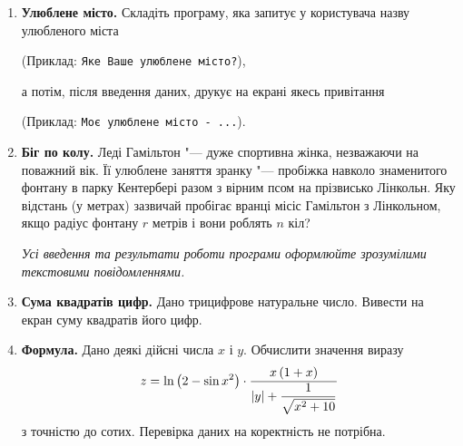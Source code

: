 \begin{enumerate}

\item \textbf{Улюблене місто.} Складіть програму, яка запитує у користувача назву улюбленого міста

(Приклад: \verb|Яке Ваше улюблене місто?|),

а потім, після введення даних, друкує на екрані якесь привітання

(Приклад: \verb|Моє улюблене місто - ...|).

\item \textbf{Біг по колу.} Леді Гамільтон "--- дуже спортивна жінка, незважаючи на поважний вік. Її улюблене заняття зранку "--- пробіжка навколо знаменитого фонтану в парку Кентербері разом з вірним псом на прізвисько Лінкольн. Яку відстань (у метрах) зазвичай пробігає вранці місіс Гамільтон з Лінкольном, якщо радіус фонтану $r$ метрів і вони роблять $n$ кіл?

{\itshape Усі введення та результати роботи програми оформлюйте зрозумілими текстовими повідомленнями.}

\item \textbf{Сума квадратів цифр.} Дано трицифрове натуральне число. Вивести на екран суму квадратів його цифр.

\item \textbf{Формула.} Дано деякі дійсні числа $x$ і $y$. Обчислити значення виразу
$$
z=\ln \left(2-\sin x^2\right)\cdot\dfrac{x\,(1+x)}{|y|+\dfrac{1}{\sqrt{\mathstrut \mathstrut x ^2+10}}}
$$
з точністю до сотих. Перевірка даних на коректність не потрібна. 
\end{enumerate}




